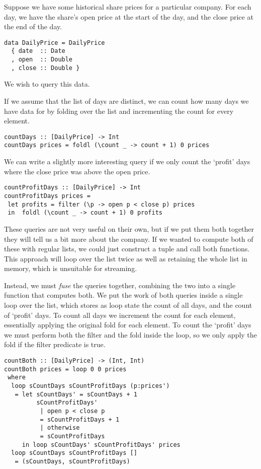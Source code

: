 Suppose we have some historical share prices for a particular company.
For each day, we have the share's open price at the start of the day, and the close price at the end of the day.

\begin{lstlisting}
data DailyPrice = DailyPrice
  { date  :: Date
  , open  :: Double
  , close :: Double }
\end{lstlisting}

We wish to query this data.

If we assume that the list of days are distinct, we can count how many days we have data for by folding over the list and incrementing the count for every element.

\begin{lstlisting}
countDays :: [DailyPrice] -> Int
countDays prices = foldl (\count _ -> count + 1) 0 prices
\end{lstlisting}

We can write a slightly more interesting query if we only count the `profit' days where the close price was above the open price.

\begin{lstlisting}
countProfitDays :: [DailyPrice] -> Int
countProfitDays prices =
 let profits = filter (\p -> open p < close p) prices
 in  foldl (\count _ -> count + 1) 0 profits
\end{lstlisting}

These queries are not very useful on their own, but if we put them both together they will tell us a bit more about the company.
If we wanted to compute both of these with regular lists, we could just construct a tuple and call both functions.
This approach will loop over the list twice as well as retaining the whole list in memory, which is unsuitable for streaming.

Instead, we must \emph{fuse} the queries together, combining the two into a single function that computes both.
We put the work of both queries inside a single loop over the list, which stores as loop state the count of all days, and the count of `profit' days.
To count all days we increment the count for each element, essentially applying the original fold for each element.
To count the `profit' days we must perform both the filter and the fold inside the loop, so we only apply the fold if the filter predicate is true.

\begin{lstlisting}
countBoth :: [DailyPrice] -> (Int, Int)
countBoth prices = loop 0 0 prices
 where
  loop sCountDays sCountProfitDays (p:prices')
   = let sCountDays' = sCountDays + 1
         sCountProfitDays'
          | open p < close p
          = sCountProfitDays + 1
          | otherwise
          = sCountProfitDays
     in loop sCountDays' sCountProfitDays' prices
  loop sCountDays sCountProfitDays []
   = (sCountDays, sCountProfitDays)
\end{lstlisting}


